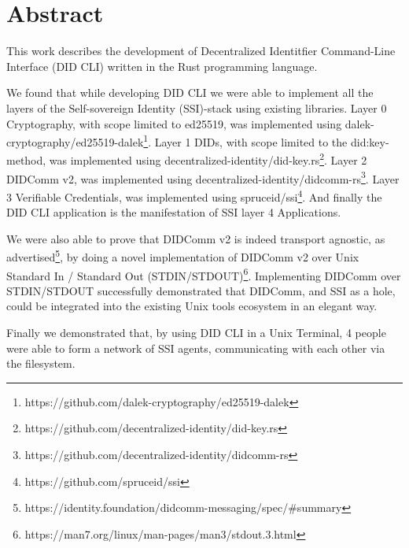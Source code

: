\chapter*{Abstract}

This work describes the development of Decentralized Identitfier Command-Line Interface (DID CLI) written in the Rust programming language.

We found that while developing DID CLI we were able to implement all the layers of the Self-sovereign Identity (SSI)-stack using existing libraries. Layer 0 Cryptography, with scope limited to ed25519, was implemented using dalek-cryptography/ed25519-dalek\footnote{https://github.com/dalek-cryptography/ed25519-dalek}. Layer 1 DIDs, with scope limited to the did:key-method, was implemented using decentralized-identity/did-key.rs\footnote{https://github.com/decentralized-identity/did-key.rs}. Layer 2 DIDComm v2, was implemented using decentralized-identity/didcomm-rs\footnote{https://github.com/decentralized-identity/didcomm-rs}.
Layer 3 Verifiable Credentials, was implemented using spruceid/ssi\footnote{https://github.com/spruceid/ssi}. And finally the DID CLI application is the manifestation of SSI layer 4 Applications.

We were also able to prove that DIDComm v2 is indeed transport agnostic, as advertised\footnote{https://identity.foundation/didcomm-messaging/spec/\#summary}, by doing a novel implementation of DIDComm v2 over Unix Standard In / Standard Out (STDIN/STDOUT)\footnote{https://man7.org/linux/man-pages/man3/stdout.3.html}. Implementing DIDComm over STDIN/STDOUT successfully demonstrated that DIDComm, and SSI as a hole, could be integrated into the existing Unix tools ecosystem in an elegant way.

Finally we demonstrated that, by using DID CLI in a Unix Terminal, 4 people were able to form a network of SSI agents, communicating with each other via the filesystem.